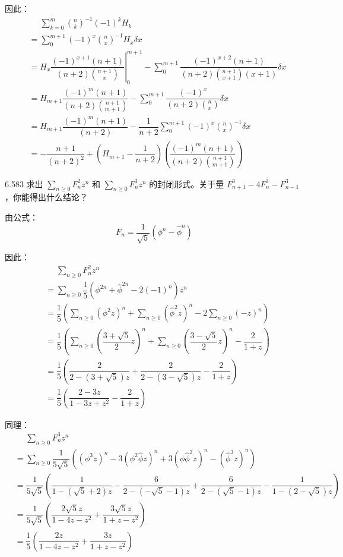 因此：
\begin{align*}
  &\phantom{=} \displaystyle\sum_{k=0}^m \binom{n}{k}^{-1} (-1)^k H_k \\
  &= \sum_{0}^{m+1} (-1)^x \binom{n}{x}^{-1} H_x \delta x \\
  &= H_x \left. \dfrac{(-1)^{x+1} (n+1)}{(n+2) \binom{n+1}{x}} \right|_0^{m+1} - \sum_{0}^{m+1} \dfrac{(-1)^{x+2} (n+1)}{(n+2) \binom{n+1}{x+1} (x+1)} \delta x \\
  &= H_{m+1} \dfrac{(-1)^m (n+1)}{(n+2) \binom{n+1}{m+1}} - \sum_{0}^{m+1} \dfrac{(-1)^x}{(n+2) \binom{n}{x}} \delta x \\
  &= H_{m+1} \dfrac{(-1)^m (n+1)}{(n+2)} - \dfrac{1}{n+2} \sum_{0}^{m+1} (-1)^x \binom{n}{x}^{-1} \delta x \\
  &= - \dfrac{n+1}{(n+2)^2} + (H_{m+1} - \dfrac{1}{n+2}) \left( \dfrac{(-1)^m (n+1)}{(n+2) \binom{n+1}{m+1}} \right)
\end{align*}

\begin{problem}{6.58}{3}
  求出 \( \sum_{n \geqslant 0} F_n^2 z^n \) 和 \( \sum_{n \geqslant 0} F_n^3 z^n \) 的封闭形式。关于量 \( F_{n+1}^3 - 4 F_n^3 - F_{n-1}^3 \)，你能得出什么结论？
\end{problem}

由公式：
\[
  \boxed{F_n = \dfrac{1}{\sqrt{5}} (\phi^n - \hat{\phi}^n)}
\]

因此：
\begin{align*}
  &\phantom{=} \sum_{n \geqslant 0} F_n^2 z^n \\
  &= \sum_{n \geqslant 0} \dfrac{1}{5} (\phi^{2n} + \hat{\phi}^{2n} - 2 (-1)^n) z^n \\
  &= \dfrac{1}{5} \left( \sum_{n \geqslant 0} (\phi^2 z)^n + \sum_{n \geqslant 0} (\hat{\phi}^2 z)^n - 2 \sum_{n \geqslant 0} (-z)^n \right) \\
  &= \dfrac{1}{5} \left( \sum_{n \geqslant 0} (\dfrac{3 + \sqrt{5}}{2} z)^n + \sum_{n \geqslant 0} (\dfrac{3 - \sqrt{5}}{2} z)^n - \dfrac{2}{1+z} \right) \\
  &= \dfrac{1}{5} \left( \dfrac{2}{2 - (3 + \sqrt{5})z} + \dfrac{2}{2 - (3 - \sqrt{5})z} - \dfrac{2}{1+z} \right) \\
  &= \dfrac{1}{5} \left( \dfrac{2-3z}{1-3z+z^2} - \dfrac{2}{1+z} \right)
\end{align*}

同理：
\begin{align*}
  &\phantom{=} \sum_{n \geqslant 0} F_n^3 z^n \\
  &= \sum_{n \geqslant 0} \dfrac{1}{5 \sqrt{5}} \left( (\phi^3 z)^n - 3 (\phi^2 \hat{\phi} z)^n + 3 (\phi \hat{\phi}^2 z)^n - (\hat{\phi}^3 z)^n \right) \\
  &= \dfrac{1}{5 \sqrt{5}} \left(\dfrac{1}{1-(\sqrt{5} + 2)z} - \dfrac{6}{2 - (- \sqrt{5} - 1)z} + \dfrac{6}{2 - (\sqrt{5} - 1)z} - \dfrac{1}{1 - (2 - \sqrt{5})z} \right) \\
  &= \dfrac{1}{5 \sqrt{5}} \left( \dfrac{2 \sqrt{5} z}{1 - 4z - z^2} + \dfrac{3 \sqrt{5} z}{1 + z - z^2} \right) \\
  &= \dfrac{1}{5} \left(\dfrac{2z}{1-4z-z^2} + \dfrac{3z}{1+z-z^2} \right)
\end{align*}


